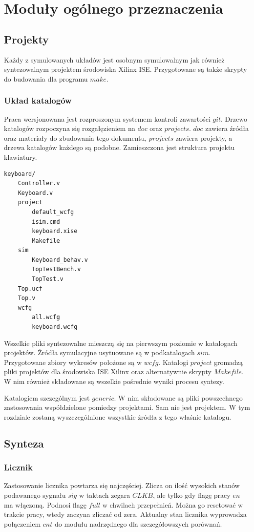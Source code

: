 \documentclass[a4paper,12pt]{article}
\begin{document}
\newpage
\section{Moduły ogólnego przeznaczenia}

\subsection{Projekty}
Każdy z symulowanych układów jest osobnym symulowalnym jak również syntezowalnym projektem środowiska Xilinx ISE. Przygotowane są także skrypty do budowania dla programu $make$.

\subsubsection{Układ katalogów}
Praca wersjonowana jest rozproszonym systemem kontroli zawartości $git$. Drzewo katalogów rozpoczyna się rozgałęzieniem na $doc$ oraz $projects$. $doc$ zawiera źródła oraz materiały do zbudowania tego dokumentu, $projects$ zawiera projekty, a drzewa katalogów każdego są podobne. Zamieszczona jest struktura projektu klawiatury.

\begin{verbatim}
keyboard/
    Controller.v
    Keyboard.v
    project
        default_wcfg
        isim.cmd
        keyboard.xise
        Makefile
    sim
        Keyboard_behav.v
        TopTestBench.v
        TopTest.v
    Top.ucf
    Top.v
    wcfg
        all.wcfg
        keyboard.wcfg
\end{verbatim}

Wszelkie pliki syntezowalne mieszczą się na pierwszym poziomie w katalogach projektów. Źródła symulacyjne usytuowane są w podkatalogach $sim$. Przygotowane zbiory wykresów położone są w $wcfg$. Katalogi $project$ gromadzą pliki projektów dla środowiska ISE Xilinx oraz alternatywnie skrypty $Makefile$. W nim również składowane są wszelkie pośrednie wyniki procesu syntezy.

Katalogiem szczególnym jest $generic$. W nim składowane są pliki powszechnego zastosowania współdzielone pomiedzy projektami. Sam nie jest projektem. W tym rozdziale zostaną wyszczególnione wszystkie źródła z tego właśnie katalogu.

\subsection{Synteza}

\subsubsection{Licznik}
Zastosowanie licznika powtarza się najczęściej. Zlicza on ilość wysokich stanów podawanego sygnału $sig$ w taktach zegara $CLKB$, ale tylko gdy flagę pracy $en$ ma włączoną. Podnosi flagę $full$ w chwilach przepełnień. Można go resetować w trakcie pracy, wtedy zaczyna zliczać od zera. Aktualny stan licznika wyprowadza połączeniem $cnt$ do modułu nadrzędnego dla szczegółowszych porównań.

\end{document}
